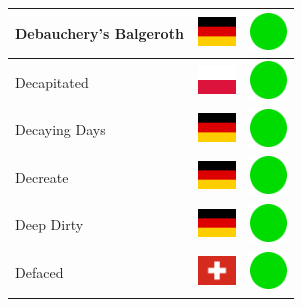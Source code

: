 \documentclass[12pt, a4paper, twoside]{report}
\begin{document}
\begin{center}
\begin{longtable}{|p{5cm}|p{2cm}|p{2cm}|}
 Debauchery's Balgeroth                                     & \includegraphics[width=1cm]{../img/flags/de} &   \includegraphics[width=1cm]{../likes/y} \\ \hline
 Decapitated                                                & \includegraphics[width=1cm]{../img/flags/pl} &   \includegraphics[width=1cm]{../likes/y} \\ \hline
 Decaying Days                                              & \includegraphics[width=1cm]{../img/flags/de} &   \includegraphics[width=1cm]{../likes/y} \\ \hline
 Decreate                                                   & \includegraphics[width=1cm]{../img/flags/de} &   \includegraphics[width=1cm]{../likes/y} \\ \hline
 Deep Dirty                                                 & \includegraphics[width=1cm]{../img/flags/de} &   \includegraphics[width=1cm]{../likes/y} \\ \hline
 Defaced                                                    & \includegraphics[width=1cm]{../img/flags/ch} &   \includegraphics[width=1cm]{../likes/y} \\ \hline

\end{longtable}
\end{center}
\end{document}
